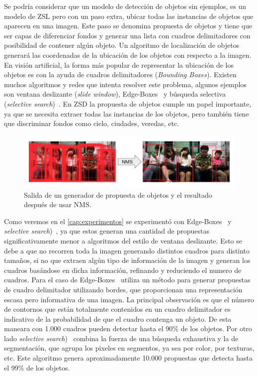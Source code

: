 Se podría considerar que un modelo de detección de objetos sin ejemplos, es un modelo de ZSL pero con un paso extra, ubicar todas las instancias de objetos que aparecen en una imagen. Este paso se denomina propuesta de objetos y tiene que ser capas de diferenciar fondos y generar una lista con cuadros delimitadores con posibilidad de contener algún objeto. Un algoritmo de localización de objetos generará las coordenadas de la ubicación de los objetos con respecto a la imagen. En visión artificial, la forma más popular de representar la ubicación de los objetos es con la ayuda de cuadros delimitadores (\textit{Bounding Boxes}). Existen muchos algoritmos y redes que intenta resolver este problema, algunos ejemplos son ventana deslizante (\textit{slide window}), Edge-Boxes~\cite{zitnick2014edge} y búsqueda selectiva (\textit{selective search})~\cite{uijlings2013selective}. En ZSD la propuesta de objetos cumple un papel importante, ya que se necesita extraer todas las instancias de los objetos, pero también tiene que discriminar fondos como cielo, ciudades, veredas, etc.\\ 

\begin{figure}[]
	\centering
	\includegraphics[width=1\textwidth]{img/NMS.png}
	\caption{Salida de un generador de propuesta de objetos y el resultado después de  usar NMS.}
	\label{fig:NMS}
\end{figure}

Como veremos en el \autoref{cap:experimentos} se experimentó con Edge-Boxes~\cite{zitnick2014edge} y \textit{selective search})~\cite{uijlings2013selective}, ya que estos generan una cantidad de propuestas significativamente menor a algoritmos del estilo de ventana deslizante. Esto se debe a que no recorren toda la imagen generando distintos cuadros para distinto tamaños, si no que extraen algún tipo de información de la imagen y generan los cuadros basándose en dicha información, refinando y reduciendo el numero de cuadros. Para el caso de Edge-Boxes~\cite{zitnick2014edge} utiliza un método para generar propuestas de cuadro delimitador utilizando bordes, que proporcionan una representación escasa pero informativa de una imagen. La principal observación es que el número de contornos que están totalmente contenidos en un cuadro delimitador es indicativo de la probabilidad de que el cuadro contenga un objeto. De esta maneara con 1.000 cuadros pueden detectar hasta el 90\% de los objetos. Por otro lado \textit{selective search})~\cite{uijlings2013selective} combina la fuerza de una búsqueda exhaustiva y la de segmentación, que agrupa los pixeles en segmentos, ya sea por color, por texturas, etc. Este algoritmo genera aproximadamente 10.000 propuestas que detecta hasta el 99\% de los objetos.

